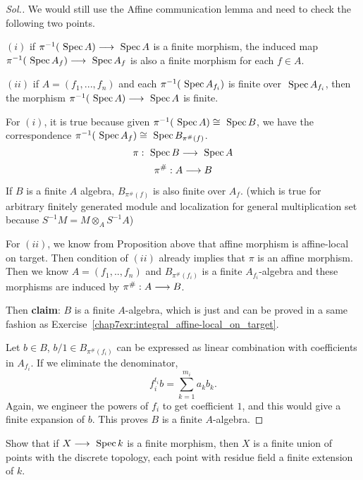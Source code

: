\documentclass[11pt]{book} %
\begin{document}
\begin{proof}[Sol.]
We would still use the Affine communication lemma and need to check the following two points.

$(i)$ if $\pi^{-1}(\text{ Spec\,} A)\longrightarrow \text{ Spec\,} A$ is a finite morphism, the induced map $\pi^{-1}(\text{ Spec\,} A_f)\longrightarrow \text{ Spec\,} A_f$ is also a finite morphism for each $f\in A$.

$(ii)$ if $A=(f_1,...,f_n)$ and each $\pi^{-1}(\text{ Spec\,} A_{f_i})$ is finite over $\text{ Spec\,} A_{f_i}$, then the morphism $\pi^{-1}(\text{ Spec\,} A)\longrightarrow \text{ Spec\,} A$ is finite.

For $(i)$, it is true because given $\pi^{-1}(\text{ Spec\,} A)\cong \text{ Spec\,} B$, we have the correspondence $\pi^{-1}(\text{ Spec\,} A_f)\cong \text{ Spec\,} B_{\pi^\#(f)}$. 
$$
\pi:\text{ Spec\,} B\longrightarrow \text{ Spec\,} A
$$
$$
\pi^\#:A\longrightarrow B
$$

If $B$ is a finite $A$ algebra, $B_{\pi^\#(f)}$ is also finite over $A_f$. (which is true for arbitrary finitely generated module  and localization for general multiplication set because $S^{-1}M=M\otimes_A S^{-1}A$)

For $(ii)$, we know from Proposition above that affine morphism is affine-local on target. Then condition of $(ii)$ already implies that $\pi$ is an affine morphism. Then we know $A=(f_1,..,f_n)$ and $B_{\pi^\#(f_i)}$  is a finite $A_{f_i}$-algebra and these morphisms are induced by $\pi^\#:A\longrightarrow B$. 

Then \textbf{claim}: $B$ is a finite $A$-algebra, which is just \cite[\href{https://stacks.math.columbia.edu/tag/02JL}{Lemma 02JL}]{stacks-project} and can be proved in a same fashion as Exercise~\ref{chap7exr:integral_affine-local_on_target}.

Let $b\in B$, $b/1\in B_{\pi^\#(f_i)}$ can be expressed as linear combination with coefficients in $A_{f_i}$. If we eliminate the denominator,
$$
f_i^{t_i}b=\sum_{k=1}^{m_i}a_k b_k.
$$
Again, we engineer the powers of $f_i$ to get coefficient $1$, and this would give a finite expansion of $b$. This proves $B$ is a finite $A$-algebra.
\end{proof}
\begin{exr}\label{chap7exr:finite_morphisms_to_specK}
Show that if $X\longrightarrow \text{ Spec\,} k$ is a finite morphism, then $X$ is a finite union of points with the discrete topology, each point with residue field a finite extension of $k$. 
\end{exr}
\end{document}
